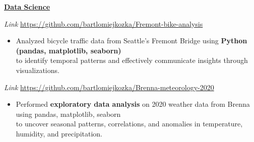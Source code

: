 \documentclass[9pt]{extarticle}
\begin{document}
\vspace{0.2cm}
\noindent\textbf{\underline{Data Science}}
\vspace{0.1cm}

\noindent
{} 
    \textit{Link} \href{https://github.com/bartlomiejkozka/Fremont-bike-analysis}{https://github.com/bartlomiejkozka/Fremont-bike-analysis} 
    \begin{itemize}[itemsep=-3pt, topsep=3pt]
    \item Analyzed bicycle traffic data from Seattle’s Fremont Bridge using \textbf{Python (pandas, matplotlib, seaborn)} \\
        to identify temporal patterns and effectively communicate insights through visualizations.
\end{itemize}

\noindent
{}
    \textit{Link} \href{https://github.com/bartlomiejkozka/Brenna-meteorology-2020}{https://github.com/bartlomiejkozka/Brenna-meteorology-2020}
\begin{itemize}[itemsep=-3pt, topsep=3pt]
    \item Performed \textbf{exploratory data analysis} on 2020 weather data from Brenna using pandas, matplotlib, seaborn \\
        to uncover seasonal patterns, correlations, and anomalies in temperature, humidity, and precipitation.
\end{itemize}



\end{document}
